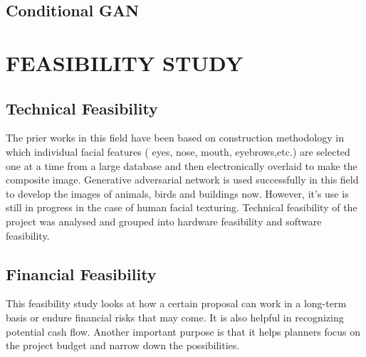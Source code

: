 \documentclass[12pt, a4paper]{report}
\begin{document}
\subsection{Conditional GAN}
\section{FEASIBILITY STUDY}
\subsection{Technical Feasibility}
\justify \large{The prier works in this field have been based on construction methodology in which individual
facial features ( eyes, nose, mouth, eyebrows,etc.) are selected one at a time from a large
database and then electronically overlaid to make the composite image. Generative adversarial
network is used successfully in this field to develop the images of animals, birds and buildings
now. However, it’s use is still in progress in the case of human facial texturing.
Technical feasibility of the project was analysed and grouped into hardware feasibility and
software feasibility.}

\subsection{Financial Feasibility}
\justify This feasibility study looks at how a certain proposal can work in a long-term basis or endure financial risks that may come. It is also helpful in recognizing potential cash flow. Another important purpose is that it helps planners focus on the project budget and narrow down the possibilities.
\end{document}
